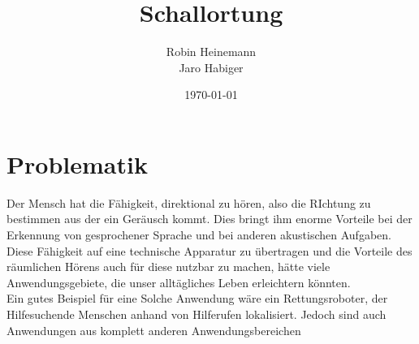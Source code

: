 \documentclass[10pt,a4paper]{article}
\title{Schallortung}
\author{Robin Heinemann\\ Jaro Habiger}
\date{\today}
\begin{document}
  \maketitle
  \begin{abstract}
  \end{abstract}
  \thispagestyle{empty}
  
  \newpage
  \tableofcontents
  \thispagestyle{empty}
  
  \newpage
  \setcounter{page}{1}
  
  \section{Problematik}
    Der Mensch hat die Fähigkeit, direktional zu hören, also die RIchtung zu bestimmen aus der ein Geräusch kommt. Dies bringt ihm enorme Vorteile bei der Erkennung von gesprochener Sprache und bei anderen akustischen Aufgaben. Diese Fähigkeit auf eine technische Apparatur zu übertragen und die Vorteile des räumlichen Hörens auch für diese nutzbar zu machen, hätte viele Anwendungsgebiete, die unser alltägliches Leben erleichtern könnten.\\
  Ein gutes Beispiel für eine Solche Anwendung wäre ein Rettungsroboter, der Hilfesuchende Menschen anhand von Hilferufen lokalisiert. 
  Jedoch sind auch Anwendungen aus komplett anderen Anwendungsbereichen 
\end{document}
